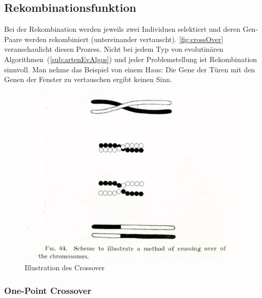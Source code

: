     \subsection{Rekombinationsfunktion}

      Bei der Rekombination werden jeweils zwei Individuen selektiert und
      deren Gen-Paare werden rekombiniert (untereinander vertauscht).
      \vref{fig:crossOver} veranschaulicht diesen Prozess.
      Nicht bei jedem Typ von evolutinären Algorithmen~(\vref{sub:artenEvAlgos}) und jeder Problemstellung ist Rekombination sinnvoll.
      Man nehme das Beispiel von einem Haus: Die Gene der Türen mit den Genen der Fenster zu vertauschen ergibt keinen Sinn.

      \begin{figure}[H]
        \includegraphics[scale=0.3, center]{graphics/morgan_crossover}
        \caption{Illustration des Crossover~\cite[]{WikipediaEN:crossOver}\label{fig:crossOver}}
      \end{figure}

      \subsubsection{One-Point Crossover}

